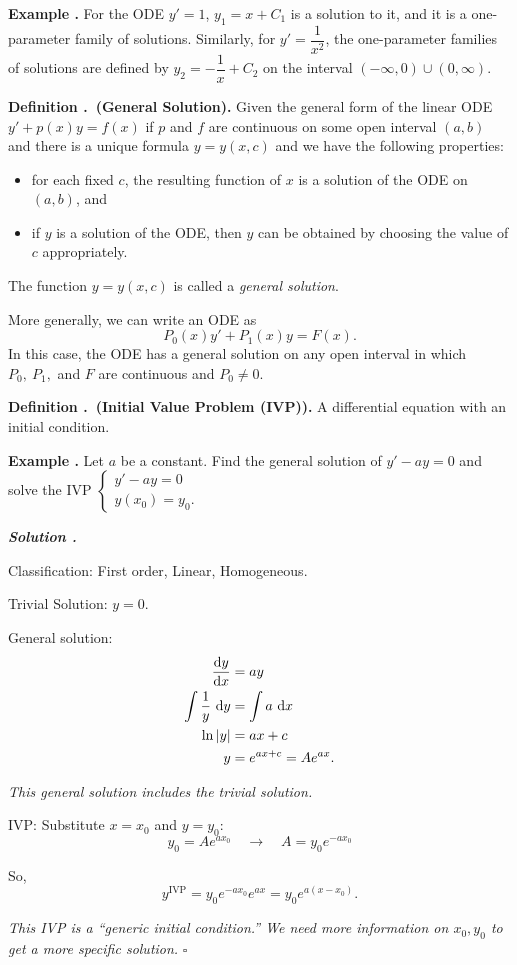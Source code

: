 \documentclass[12pt, a4paper]{article}
\newcounter{index}[subsection]
\newenvironment*{df}[1]{\par\noindent\textbf{Definition \thesubsection.\stepcounter{index}\theindex\ (#1).}}{\par}
\newenvironment*{eg}{\begin{framed}\par\noindent\textbf{Example \thesubsection.\stepcounter{index}\theindex}}{\par\end{framed}}
\newcounter{nprf}[subsection]
\newenvironment*{sol}{\par\indent\textbf{\textit{Solution \stepcounter{nprf}\thenprf.}}\par}{\hfill{$\square$}\par}
\def\d{{\mathrm{d}}}
\begin{document}
\begin{eg}
	For the ODE $y'=1$, $y_1=x+C_1$ is a solution to it, and it is a one-parameter family of solutions. Similarly, for $y'=\dfrac{1}{x^2}$, the one-parameter families of solutions are defined by $y_2=-\dfrac{1}{x}+C_2$ on the interval $(-\infty,0)\cup(0,\infty)$.
\end{eg}
\begin{df}{General Solution}
	Given the general form of the linear ODE $y'+p(x)y=f(x)$ if $p$ and $f$ are continuous on some open interval $(a,b)$ and there is a unique formula $y=y(x,c)$ and we have the following properties: 
	\begin{itemize}
		\item for each fixed $c$, the resulting function of $x$ is a solution of the ODE on $(a,b)$, and
		\item if $y$ is a solution of the ODE, then $y$ can be obtained by choosing the value of $c$ appropriately. 
	\end{itemize}
	The function $y=y(x,c)$ is called a \textit{general solution}. \par More generally, we can write an ODE as \[P_0(x)y'+P_1(x)y=F(x).\] In this case, the ODE has a general solution on any open interval in which $P_0,\ P_1,$ and $F$ are continuous and $P_0\neq0$.
\end{df}
\begin{df}{Initial Value Problem (IVP)}
	A differential equation with an initial condition.
\end{df}
\begin{eg}
	Let $a$ be a constant. Find the general solution of $y'-ay=0$ and solve the IVP $\begin{cases}y'-ay=0\\y(x_0)=y_0.\end{cases}$
	\begin{sol}
		Classification: First order, Linear, Homogeneous.\par Trivial Solution: $y=0$.\par General solution: \[\begin{aligned}\dv{y}{x}&=ay\\\int\dfrac{1}{y}\ \d y&=\int a\ \d x\\\ln\qty|y|&=ax+c\\y&=e^{ax+c}=Ae^{ax}.\end{aligned}\]\par\textit{This general solution includes the trivial solution.}\par IVP: Substitute $x=x_0$ and $y=y_0$: \[y_0=Ae^{ax_0}\quad\longrightarrow\quad A=y_0e^{-ax_0}\]\par So, \[y^\text{IVP}=y_0e^{-ax_0}e^{ax}=y_0e^{a(x-x_0)}.\]\par \textit{This IVP is a ``generic initial condition.'' We need more information on $x_0, y_0$ to get a more specific solution. }
	\end{sol}
\end{eg}
\end{document}
